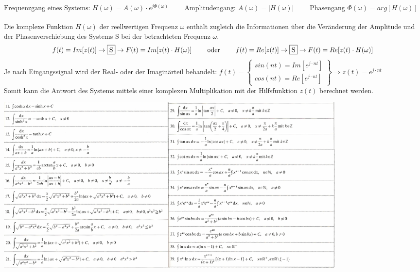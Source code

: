 $ \text{Frequenzgang eines Systems: } H(\omega) = A(\omega) \cdot e^{j \Phi(\omega)} \qquad 
\text{ Amplitudengang: } A(\omega) = |H(\omega)| \qquad \text{ Phasengang } \Phi(\omega) = arg[H(\omega)] $ \\ \\
Die komplexe Funktion $H(\omega)$ der reellwertigen Frequenz $\omega$ enthält zugleich die Informationen über 
die Veränderung der Amplitude und der Phasenverschiebung des Systems S bei der betrachteten Frequenz $\omega$.
$$f(t) = Im[z(t)] \to \fbox{S}\to F(t) = Im[z(t) \cdot H(\omega)] \qquad \text{ oder } 
\qquad f(t) = Re[z(t)] \to \fbox{S}\to F(t) = Re[z(t) \cdot H(\omega)]$$
Je nach Eingangssignal wird der Real- oder der Imaginärteil behandelt: 
$ f(t) = 
    \left\{
    \begin{array}{l}
           sin(n t) = Im[e^{j \cdot n t}]\\
           cos(n t) = Re[e^{j \cdot n t}]
        \end{array}
    \right\}
\Longrightarrow
z(t) = e^{j \cdot n t}
$ \\

Somit kann die Antwort des Systems mittels einer komplexen Multiplikation mit der Hilfsfunktion $z(t)$ berechnet werden.


\begin{center}
\includegraphics[width=18cm]{./bilder/integral2.png}
\end{center}